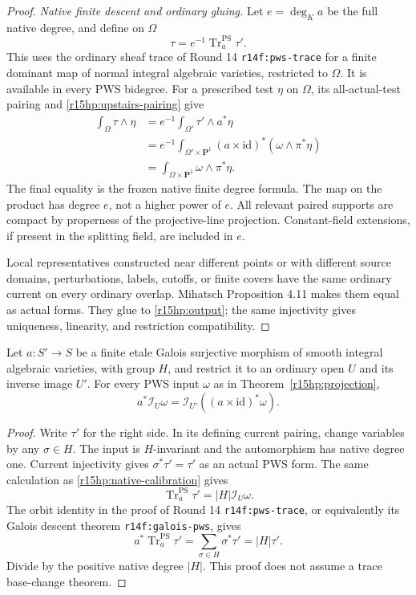 \begin{proof}
\emph{Native finite descent and ordinary gluing.}
Let $e=\deg_K a$ be the full native degree, and define on $\Omega$
\[
             \tau=e^{-1}\operatorname{Tr}^{\mathrm{PS}}_a\tau'.
\tag{HP15.10}\label{r15hp:finite-descent}
\]
This uses the ordinary sheaf trace of Round 14
\texttt{r14f:pws-trace} for a finite dominant map of normal
integral algebraic varieties, restricted to $\Omega$.
It is available in every PWS bidegree.  For a prescribed test
$\eta$ on $\Omega$, its all-actual-test pairing and
\eqref{r15hp:upstairs-pairing} give
\[
 \begin{split}
 \int_\Omega\tau\wedge\eta
 &=e^{-1}\int_{\Omega'}\tau'\wedge a^*\eta\\
 &=e^{-1}\int_{\Omega'\times\mathbf P^1}
                  (a\times\mathrm{id})^*
                       (\omega\wedge\pi^*\eta)\\
 &=\int_{\Omega\times\mathbf P^1}\omega\wedge\pi^*\eta.
 \end{split}
\tag{HP15.11}\label{r15hp:native-calibration}
\]
The final equality is the frozen native finite degree formula.
The map on the product has degree $e$, not a higher power of
$e$.  All relevant paired supports are compact by properness of
the projective-line projection.  Constant-field extensions,
if present in the splitting field, are included in $e$.

Local representatives constructed near different points or with
different source domains, perturbations, labels, cutoffs, or
finite covers have the same ordinary current on every ordinary
overlap.  Mihatsch Proposition 4.11 makes them equal as actual
forms.  They glue to \eqref{r15hp:output}; the same injectivity
gives uniqueness, linearity, and restriction compatibility.
\end{proof}

\begin{lemma}
\label{r15hp:finite-compatibility}
Let $a:S'\to S$ be a finite etale Galois surjective morphism of
smooth integral algebraic varieties, with group $H$, and restrict
it to an ordinary open $U$ and its inverse image $U'$.
For every PWS input $\omega$ as in Theorem~\ref{r15hp:projection},
\[
 a^*\mathcal I_U\omega
       =\mathcal I_{U'}((a\times\mathrm{id})^*\omega).
\tag{HP15.12}\label{r15hp:finite-pullback}
\]
\end{lemma}

\begin{proof}
Write $\tau'$ for the right side.  In its defining current
pairing, change variables by any $\sigma\in H$.  The input is
$H$-invariant and the automorphism has native degree one.
Current injectivity gives $\sigma^*\tau'=\tau'$ as an actual
PWS form.  The same calculation as
\eqref{r15hp:native-calibration} gives
\[
 \operatorname{Tr}^{\mathrm{PS}}_a\tau'
                              =|H|\mathcal I_U\omega.
\]
The orbit identity in the proof of Round 14
\texttt{r14f:pws-trace}, or equivalently its Galois descent
theorem \texttt{r14f:galois-pws}, gives
\[
 a^*\operatorname{Tr}^{\mathrm{PS}}_a\tau'
             =\sum_{\sigma\in H}\sigma^*\tau'=|H|\tau'.
\]
Divide by the positive native degree $|H|$.
This proof does not assume a trace base-change theorem.
\end{proof}

